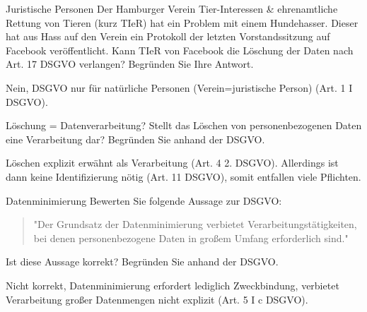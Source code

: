 \documentclass{article}
\begin{document}
\begin{exercise}{Juristische Personen}
  Der Hamburger Verein Tier-Interessen \& ehrenamtliche Rettung von Tieren (kurz TIeR) hat ein Problem mit einem Hundehasser. Dieser hat aus Hass auf den Verein ein Protokoll der letzten Vorstandssitzung auf Facebook veröffentlicht. Kann TIeR von Facebook die Löschung der Daten nach Art. 17 DSGVO verlangen? Begründen Sie Ihre Antwort.

  \begin{solution}
    Nein, DSGVO nur für natürliche Personen (Verein=juristische Person) (Art. 1 I DSGVO).
  \end{solution}
\end{exercise}

\begin{exercise}{Löschung = Datenverarbeitung?}
  Stellt das Löschen von personenbezogenen Daten eine Verarbeitung dar? Begründen Sie anhand der DSGVO.

  \begin{solution}
    Löschen explizit erwähnt als Verarbeitung (Art. 4 2. DSGVO). Allerdings ist dann keine Identifizierung nötig (Art. 11 DSGVO), somit entfallen viele Pflichten.
  \end{solution}
\end{exercise}

\begin{exercise}{Datenminimierung}\label{ex:datenminimierung}
  Bewerten Sie folgende Aussage zur DSGVO:
  \begin{quote}"Der Grundsatz der Datenminimierung verbietet Verarbeitungstätigkeiten, bei denen personenbezogene Daten in großem Umfang erforderlich sind."\end{quote}
  Ist diese Aussage korrekt? Begründen Sie anhand der DSGVO.

  \begin{solution}
    Nicht korrekt, Datenminimierung erfordert lediglich Zweckbindung, verbietet Verarbeitung großer Datenmengen nicht explizit (Art. 5 I c DSGVO).
  \end{solution}
\end{exercise}
\end{document}
